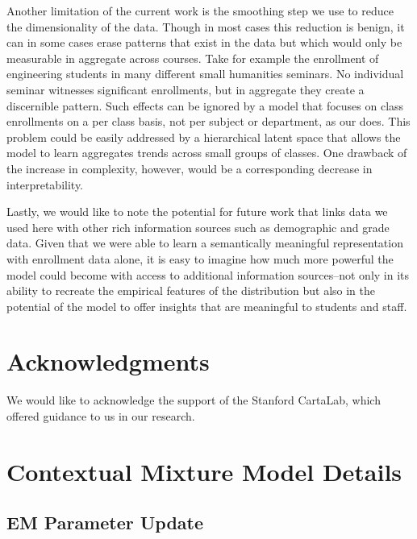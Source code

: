 \documentclass{edm_template}
\begin{document}
Another limitation of the current work is the smoothing step we use to reduce the dimensionality of the data. Though in most cases this reduction is benign, it can in some cases erase patterns that exist in the data but which would only be measurable in aggregate across courses. Take for example the enrollment of engineering students in many different small humanities seminars. No individual seminar witnesses significant enrollments, but in aggregate they create a discernible pattern. Such effects can be ignored by a model that focuses on class enrollments on a per class basis, not per subject or department, as our does. This problem could be easily addressed by a hierarchical latent space that allows the model to learn aggregates trends across small groups of classes. One drawback of the increase in complexity, however, would be a corresponding decrease in interpretability. 

Lastly, we would like to note the potential for future work that links data we used here with other rich information sources such as demographic and grade data. Given that we were able to learn a semantically meaningful representation with enrollment data alone, it is easy to imagine how much more powerful the model could become with access to additional information sources--not only in its ability to recreate the empirical features of the distribution but also in the potential of the model to offer insights that are meaningful to students and staff. 

\section{Acknowledgments}

We would like to acknowledge the support of the Stanford CartaLab, which offered guidance to us in our research.  


 

\balancecolumns
\appendix
\section{Contextual Mixture Model Details}
\subsection{EM Parameter Update}
\end{document}

